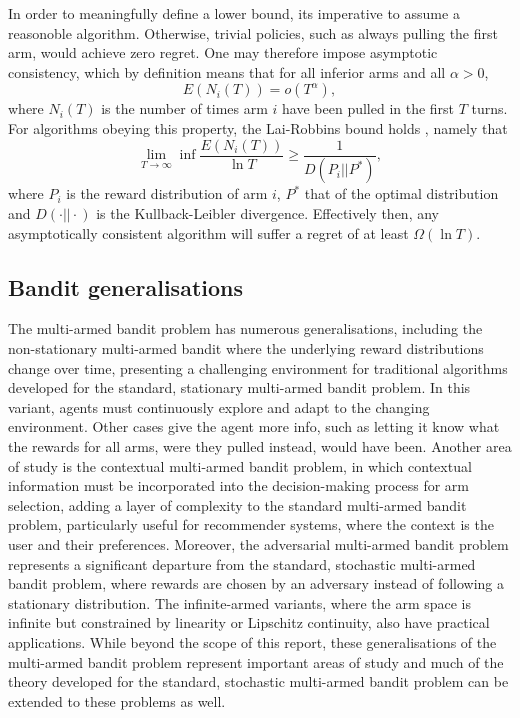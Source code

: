In order to meaningfully define a lower bound, its imperative to assume a reasonoble algorithm.
Otherwise, trivial policies, such as always pulling the first arm, would achieve zero regret.
One may therefore impose asymptotic consistency, which by definition means that for all inferior arms and all $\alpha > 0$,
\begin{equation}
    E(N_i(T)) = o(T^{\alpha}),
\end{equation}
where $N_i(T)$ is the number of times arm $i$ have been pulled in the first $T$ turns.
For algorithms obeying this property, the Lai-Robbins bound holds \cite{lai1985}, namely that
\begin{equation}
    \lim_{T\to\infty} \inf \frac{E(N_i(T))}{\ln T} \geq \frac{1}{D(P_i || P^*)},
\end{equation}
where $P_i$ is the reward distribution of arm $i$, $P^*$ that of the optimal distribution and $D(\cdot || \cdot)$ is the Kullback-Leibler divergence.
Effectively then, any asymptotically consistent algorithm will suffer a regret of at least $\Omega(\ln T)$.


\subsection{Bandit generalisations}
The multi-armed bandit problem has numerous generalisations, including the non-stationary multi-armed bandit where the underlying reward distributions change over time, presenting a challenging environment for traditional algorithms developed for the standard, stationary multi-armed bandit problem.
In this variant, agents must continuously explore and adapt to the changing environment.
Other cases give the agent more info, such as letting it know what the rewards for all arms, were they pulled instead, would have been.
Another area of study is the contextual multi-armed bandit problem, in which contextual information must be incorporated into the decision-making process for arm selection, adding a layer of complexity to the standard multi-armed bandit problem, particularly useful for recommender systems, where the context is the user and their preferences.
Moreover, the adversarial multi-armed bandit problem represents a significant departure from the standard, stochastic multi-armed bandit problem, where rewards are chosen by an adversary instead of following a stationary distribution.
The infinite-armed variants, where the arm space is infinite but constrained by linearity or Lipschitz continuity, also have practical applications.
While beyond the scope of this report, these generalisations of the multi-armed bandit problem represent important areas of study and much of the theory developed for the standard, stochastic multi-armed bandit problem can be extended to these problems as well.


